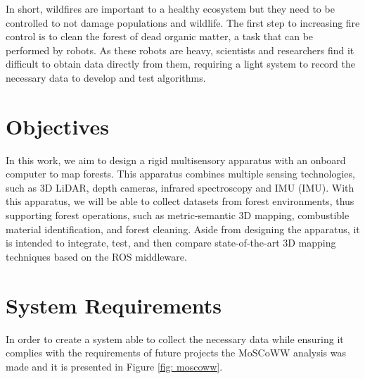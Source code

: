 In short, wildfires are important to a healthy ecosystem but they need to be controlled to not damage populations and wildlife. The first step to increasing fire control is to clean the forest of dead organic matter, a task that can be performed by robots. As these robots are heavy, scientists and researchers find it difficult to obtain data directly from them, requiring a light system to record the necessary data to develop and test algorithms.

\section{Objectives}
In this work, we aim to design a rigid multisensory apparatus with an onboard computer to map forests. This apparatus combines multiple sensing technologies, such as 3D \acs{LiDAR}, depth cameras, infrared spectroscopy and \acl{IMU} (\acs{IMU}). With this apparatus, we will be able to collect datasets from forest environments, thus supporting forest operations, such as metric-semantic 3D mapping, combustible material identification, and forest cleaning. Aside from designing the apparatus, it is intended to integrate, test, and then compare state-of-the-art 3D mapping techniques based on the ROS middleware.

\section{System Requirements}

In order to create a system able to collect the necessary data while ensuring it complies with the requirements of future projects the MoSCoWW analysis was made and it is presented in Figure \ref{fig: moscoww}.

